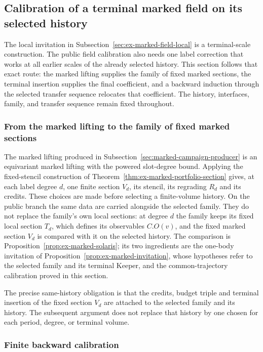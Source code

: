 \subsection{Calibration of a terminal marked field on its selected history}
\label{sec:actual-marked-portfolio-calibration}

The local invitation in Subsection~\ref{sec:ex-marked-field-local} is a
terminal-scale construction. The public field calibration also needs one
label correction that works at all earlier scales of the already selected
history. This section follows that exact route: the marked lifting supplies the
family of fixed marked sections, the terminal insertion supplies the final coefficient, and a
backward induction through the selected transfer sequence relocates that coefficient.
The history, interfaces, family, and transfer sequence remain fixed throughout.

\subsubsection{From the marked lifting to the family of fixed marked sections}

The marked lifting produced in Subsection~\ref{sec:marked-campaign-producer} is an
equivariant marked lifting with the powered slot-degree bound. Applying the fixed-stencil
construction of Theorem~\ref{thm:ex-marked-portfolio-section} gives, at
each label degree $d$, one finite section $V_d$, its stencil, its
regrading $R_d$ and its credits. These choices
are made before selecting a finite-volume history. On the public branch the
same data are carried alongside the selected family. They do not replace
the family's own local sections: at degree $d$ the family keeps its fixed
local section $T_d$, which defines its observables $C.O(v)$, and the
fixed marked section $V_d$ is compared with it on the selected history. The
comparison is Proposition~\ref{prop:ex-marked-solaris}; its two
ingredients are the one-body invitation of
Proposition~\ref{prop:ex-marked-invitation}, whose hypotheses refer to
the selected family and its terminal Keeper, and the common-trajectory
calibration proved in this section.

The precise same-history obligation is that the credits, budget triple and
terminal insertion of the fixed section $V_d$ are attached to the selected
family and its history. The subsequent argument does not replace
that history by one chosen for each period, degree, or terminal volume.

\subsubsection{Finite backward calibration}

